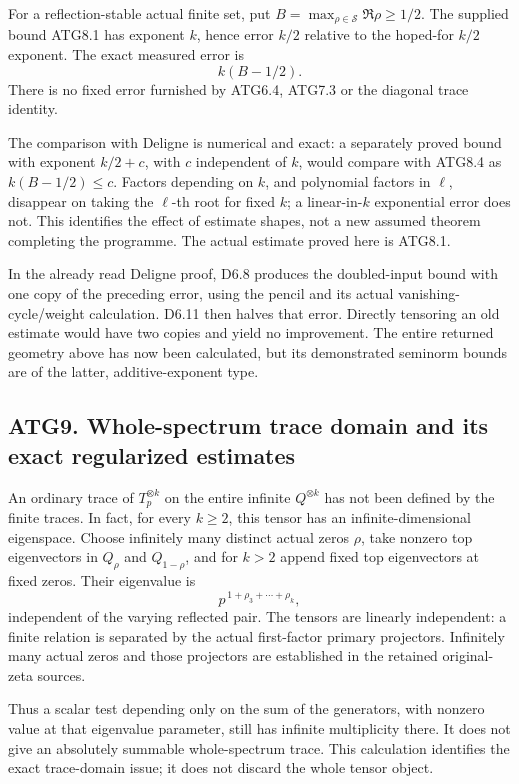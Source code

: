 For a reflection-stable actual finite set, put
\(B=\max_{\rho\in\mathscr S}\Re\rho\ge1/2\). The supplied bound ATG8.1
has exponent \(k\), hence error \(k/2\) relative to the hoped-for
\(k/2\) exponent. The exact measured error is \[
k(B-1/2).
\tag{ATG8.5}
\] There is no fixed error furnished by ATG6.4, ATG7.3 or the diagonal
trace identity.

The comparison with Deligne is numerical and exact: a separately proved
bound with exponent \(k/2+c\), with \(c\) independent of \(k\), would
compare with ATG8.4 as \(k(B-1/2)\le c\). Factors depending on \(k\),
and polynomial factors in \(\ell\), disappear on taking the \(\ell\)-th
root for fixed \(k\); a linear-in-\(k\) exponential error does not. This
identifies the effect of estimate shapes, not a new assumed theorem
completing the programme. The actual estimate proved here is ATG8.1.

In the already read Deligne proof, D6.8 produces the doubled-input bound
with one copy of the preceding error, using the pencil and its actual
vanishing-cycle/weight calculation. D6.11 then halves that error.
Directly tensoring an old estimate would have two copies and yield no
improvement. The entire returned geometry above has now been calculated,
but its demonstrated seminorm bounds are of the latter,
additive-exponent type.

\subsection{ATG9. Whole-spectrum trace domain and its exact regularized
estimates}\label{atg9.-whole-spectrum-trace-domain-and-its-exact-regularized-estimates}

An ordinary trace of \(T_p^{\otimes k}\) on the entire infinite
\(Q^{\otimes k}\) has not been defined by the finite traces. In fact,
for every \(k\ge2\), this tensor has an infinite-dimensional eigenspace.
Choose infinitely many distinct actual zeros \(\rho\), take nonzero top
eigenvectors in \(Q_\rho\) and \(Q_{1-\rho}\), and for \(k>2\) append
fixed top eigenvectors at fixed zeros. Their eigenvalue is \[
p^{\,1+\rho_3+\cdots+\rho_k},
\] independent of the varying reflected pair. The tensors are linearly
independent: a finite relation is separated by the actual first-factor
primary projectors. Infinitely many actual zeros and those projectors
are established in the retained original-zeta sources.

Thus a scalar test depending only on the sum of the generators, with
nonzero value at that eigenvalue parameter, still has infinite
multiplicity there. It does not give an absolutely summable
whole-spectrum trace. This calculation identifies the exact trace-domain
issue; it does not discard the whole tensor object.

